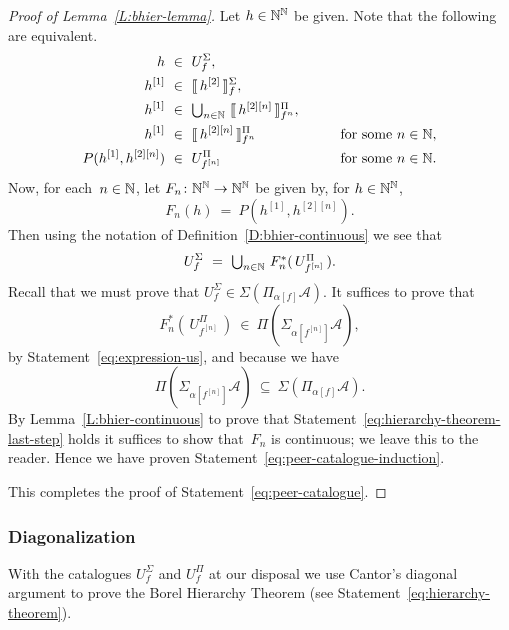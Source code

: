 \documentclass[main.tex]{subfiles}
\begin{document}
\begin{proof}[Proof of Lemma~\ref{L:bhier-lemma}]
Let $h\in\mathbb{N}^{\mathbb{N}}$ be given.
Note that the following are equivalent.
\begin{alignat*}{3}
h \ &\in\  U^\Sigma_f, \\
h^{[1]} \ &\in\ \decode{\,h^{[2]}\,}^\Sigma_f, \\
h^{[1]} \ &\in\ 
\textstyle{\bigcup_{n\in\N}}\ 
        \decode{\,h^{[2][n]}\,}^\Pi_{f^{n}}, \qquad\\
 h^{[1]} \ &\in\ 
        \decode{\,h^{[2][n]}\,}^\Pi_{f^{n}} 
\qquad&\text{for some $n\in\N$},\\
 P(h^{[1]},h^{[2][n]}) \ &\in\ 
        U^{\Pi}_{f^{[n]}} 
\qquad&\text{for some $n\in\N$}.
\end{alignat*}
Now,
for each~$n\in\mathbb{N}$,
let $F_n\colon \mathbb{N}^{\mathbb{N}} \rightarrow\mathbb{N}^{\mathbb{N}}$
be given by, for $h\in\mathbb{N}^{\mathbb{N}}$,
\begin{equation*}
F_n(h) \ =\  P(h^{[1]},h^{[2][n]}).
\end{equation*}
Then using the notation of Definition~\ref{D:bhier-continuous}
we see that
\begin{equation}
\label{eq:expression-us}
U^\Sigma_f \ =\ 
\textstyle{\bigcup_{n\in\N}} \ F_n^*(\, U^\Pi_{f^{[n]}}\,).
\end{equation}
Recall that we must prove
that $U^\Sigma_f \in \Sigma(\Pi_{\alpha[f]}\mathcal{A})$.
It suffices to prove that
\begin{equation}
\label{eq:hierarchy-theorem-last-step}
F_n^*(\, U^\Pi_{f^{[n]}}\,) \ \in\  \Pi(\Sigma_{\alpha[f^{[n]}]}\mathcal{A}),
\end{equation}
by  Statement~\eqref{eq:expression-us},
and because we have
\begin{equation*}
\Pi(\Sigma_{\alpha[f^{[n]}]}\mathcal{A}) 
\ \subseteq \ \Sigma(\Pi_{\alpha[f]}\mathcal{A}).
\end{equation*}
By Lemma~\ref{L:bhier-continuous}
to prove
that Statement~\eqref{eq:hierarchy-theorem-last-step}
holds
it suffices to show that~$F_n$
is continuous; we leave this to the reader.
Hence we have proven Statement~\eqref{eq:peer-catalogue-induction}.

This completes the proof of Statement~\eqref{eq:peer-catalogue}.
\end{proof}

\subsubsection{Diagonalization}$\,$\\
With the catalogues $U^\Sigma_f$ and $U^\Pi_f$
at our disposal
we use Cantor's diagonal argument
to prove the Borel Hierarchy Theorem
(see Statement~\eqref{eq:hierarchy-theorem}).
\end{document}

